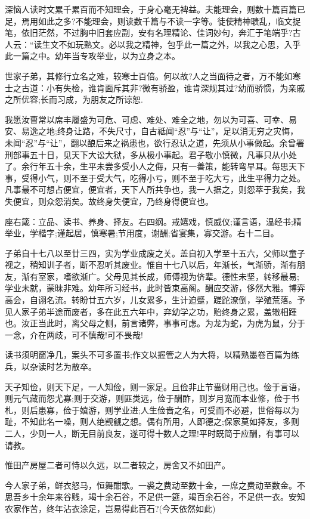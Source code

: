 \documentclass[letterpaper,10pt,english]{sphinxmanual}
\begin{document}
深恼人读时文累千累百而不知理会，于身心毫无裨益。夫能理会，则数十篇百篇已足，焉用如此之多?不能理会，则读数千篇与不读一字等。徒使精神聩乱，临文捉笔，依旧茫然，不过胸中旧套应副，安有名理精论、佳词妙句，奔汇于笔端乎?古人云：“读生文不如玩熟文。必以我之精神，包乎此一篇之外，以我之心思，入乎此一篇之中。幼年当专攻举业，以为立身之本。

世家子弟，其修行立名之难，较寒士百倍。何以故?人之当面待之者，万不能如寒士之古道：小有失检，谁肯面斥其非?微有骄盈，谁肯深规其过?幼而骄惯，为亲戚之所优容;长而习成，为朋友之所谅恕.

我愿汝曹常以席丰履盛为可危、可虑、难处、难全之地，勿以为可喜、可幸、易安、易逸之地;终身让路，不失尺寸，自古祗闻“忍”与“让”，足以消无穷之灾悔，未闻“忍”与“让”，翻以酿后来之祸患也，欲行忍认之道，先须从小事做起。余曾署刑部事五十日，见天下大讼大狱，多从极小事起。君子敬小慎微，凡事只从小处了。余行年五十余，生平未尝多受小人之侮，只有一善策，能转弯早耳。每思天下事，受得小气，则不至于受大气，吃得小亏，则不至于吃大亏，此生平得力之处。凡事最不可想占便宜，便宜者，天下人所共争也，我一人据之，则怨萃于我矣，我失便宜，则众怨消矣。故终身失便宜，乃终身得便宜也。

座右箴：立品、读书、养身、择友。右四纲。戒嬉戏，慎威仪;谨言语，温经书;精举业，学楷字;谨起居，慎寒暑;节用度，谢酬;省宴集，寡交游。右十二目。

子弟自十七八以至廿三四，实为学业成废之关。盖自初入学至十五六，父师以童子视之，稍知训子者，断不忍听其废业。惟自十七八以后，年渐长，气渐骄，渐有朋友，渐有室家，嗜欲渐广。父母见其长成，师傅视为侪辈。德性未坚，转移最易;学业未就，蒙昧非难。幼年所习经书，此时皆束高阁。酬应交游，侈然大雅。博弈高会，自诩名流。转盼廿五六岁，儿女累多，生计迫蹙，蹉跎潦倒，学殖荒落。予见人家子弟半途而废者，多在此五六年中，弃幼学之功，贻终身之累，盖辙相踵也。汝正当此时，离父母之侧，前言诸弊，事事可虑。为龙为蛇，为虎为鼠，分于一念，介在两歧，可不慎哉!可不畏哉!

读书须明窗净几，案头不可多置书;作文以握管之人为大将，以精熟墨卷百篇为练兵，以杂读时艺为散卒。

天子知俭，则天下足，一人知俭，则一家足。且俭非止节啬财用己也。俭于言语，则元气藏而怨尤寡;则于交游，则匪类远，俭于酬酢，则岁月宽而本业修，俭于书札，则后患寡，俭于嬉游，则学业进;人生俭啬之名，可受而不必避，世俗每以为耻，不知此名一噪，则人绝觊觎之想。偶有所用，人即德之;保家莫如择友，多则二人，少则一人，断无目前良友，遂可得十数人之理!平时既简于应酬，有事可以请教。

惟田产房屋二者可恃以久远，以二者较之，房舍又不如田产。

今人家子弟，鲜衣怒马，恒舞酣歌。一裘之费动至数十金，一席之费动至数金。不思吾乡十余年来谷贱，竭十余石谷，不足供一筵，竭百余石谷，不足供一衣。安知农家作苦，终年沾衣涂足，岂易得此百石?(今天依然如此)
\end{document}
